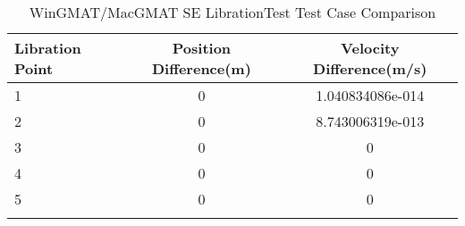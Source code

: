 \begin{table}[htbp!]
\centering
\caption{ WinGMAT/MacGMAT SE LibrationTest Test Case Comparison}
      \begin{tabular}{lcc}
      \hline\hline
          Libration Point & Position Difference(m) & Velocity Difference(m/s) \\
         \hline
         1 & 0 & 1.040834086e-014 \\
         2 & 0 & 8.743006319e-013 \\
         3 & 0 & 0 \\
         4 & 0 & 0 \\
         5 & 0 & 0 \\
      \hline\hline
      \label{Table: WinGMAT-MacGMAT SE LibrationTest Table} 
\end{tabular}
\end{table}
